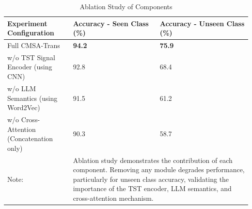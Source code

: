\begin{table}[htbp]
\centering
\caption{Ablation Study of Components}
\label{tab:ablation}
\begin{tabular}{p{5cm}p{3.5cm}p{3.5cm}}
\toprule
\textbf{Experiment Configuration} & \textbf{Accuracy - Seen Class (\%)} & \textbf{Accuracy - Unseen Class (\%)} \\
\midrule
Full CMSA-Trans & \textbf{94.2} & \textbf{75.9} \\
\midrule
w/o TST Signal Encoder (using CNN) & 92.8 & 68.4 \\
\midrule
w/o LLM Semantics (using Word2Vec) & 91.5 & 61.2 \\
\midrule
w/o Cross-Attention (Concatenation only) & 90.3 & 58.7 \\
\midrule
Note: & \multicolumn{2}{p{7cm}}{Ablation study demonstrates the contribution of each component. Removing any module degrades performance, particularly for unseen class accuracy, validating the importance of the TST encoder, LLM semantics, and cross-attention mechanism.} \\
\bottomrule
\end{tabular}
\end{table}